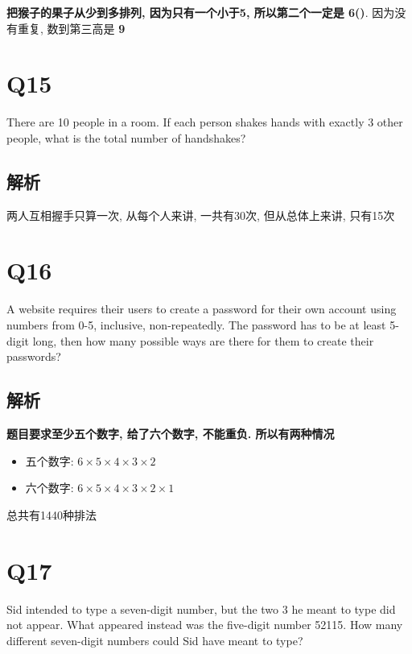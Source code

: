     \textbf{把猴子的果子从少到多排列, 因为只有一个小于5, 所以第二个一定是
    6()}. 因为没有重复, 数到第三高是 \textbf{9}

\section{Q15}

  There are 10 people in a room. If each person shakes hands with exactly 3
  other people, what is the total number of handshakes?

  \subsection{解析}

    两人互相握手只算一次, 从每个人来讲, 一共有30次, 但从总体上来讲, 只有15次

\section{Q16}

  A website requires their users to create a password for their own account
  using numbers from 0-5, inclusive, non-repeatedly. The password has to be
  at least 5-digit long, then how many possible ways are there for them to
  create their passwords?

  \subsection{解析}

    \textbf{题目要求至少五个数字, 给了六个数字, 不能重负. 所以有两种情况}

    \begin{itemize}
      \item 五个数字: $ 6 \times 5 \times 4 \times 3 \times 2 $
      \item 六个数字: $ 6 \times 5 \times 4 \times 3 \times 2 \times 1 $
    \end{itemize}

    总共有1440种排法

\section{Q17}

  Sid intended to type a seven-digit number, but the two 3 he meant to type
  did not appear. What appeared instead was the five-digit number 52115.
  How many different seven-digit numbers could Sid have meant to type?

